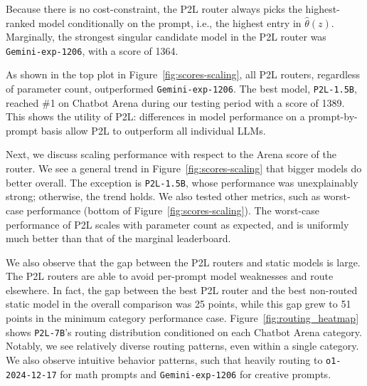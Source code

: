 Because there is no cost-constraint, the P2L router always picks the highest-ranked model conditionally on the prompt, i.e., the highest entry in $\hat\theta(z)$. 
Marginally, the strongest singular candidate model in the P2L router was \texttt{Gemini-exp-1206}, with a score of 1364. 

As shown in the top plot in Figure~\ref{fig:scores-scaling}, all P2L routers, regardless of parameter count, outperformed \texttt{Gemini-exp-1206}.
The best model, \texttt{P2L-1.5B}, reached \#1 on Chatbot Arena during our testing period with a score of 1389. 
This shows the utility of P2L: differences in model performance on a prompt-by-prompt basis allow P2L to outperform all individual LLMs.

Next, we discuss scaling performance with respect to the Arena score of the router.
We see a general trend in Figure~\ref{fig:scores-scaling} that bigger models do better overall.
The exception is \texttt{P2L-1.5B}, whose performance was unexplainably strong; otherwise, the trend holds.
We also tested other metrics, such as worst-case performance  (bottom of Figure~\ref{fig:scores-scaling}).
The worst-case performance of P2L scales with parameter count as expected, and is uniformly much better than that of the marginal leaderboard.

We also observe that the gap between the P2L routers and static models is large.
The P2L routers are able to avoid per-prompt model weaknesses and route elsewhere. In fact, the gap between the best P2L router and the best non-routed static model in the overall comparison was 25 points, while this gap grew to 51 points in the minimum category performance case. Figure~\ref{fig:routing_heatmap} shows \texttt{P2L-7B}'s routing distribution conditioned on each Chatbot Arena category. Notably, we see relatively diverse routing patterns, even within a single category. We also observe intuitive behavior patterns, such that heavily routing to \texttt{o1-2024-12-17} for math prompts and \texttt{Gemini-exp-1206} for creative prompts.


